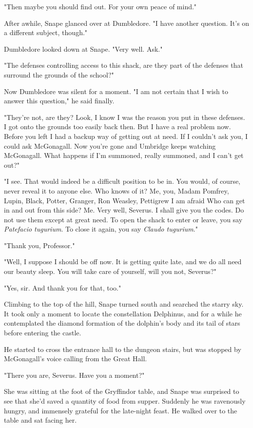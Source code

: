 "Then maybe you should find out. For your own peace of mind."

After awhile, Snape glanced over at Dumbledore. "I have another question. It's on a different subject, though."

Dumbledore looked down at Snape. "Very well. Ask."

"The defenses controlling access to this shack, are they part of the defenses that surround the grounds of the school?"

Now Dumbledore was silent for a moment. "I am not certain that I wish to answer this question," he said finally.

"They're not, are they? Look, I know I was the reason you put in these defenses. I got onto the grounds too easily back{\el} then. But I have a real problem now. Before you left I had a backup way of getting out at need. If I couldn't ask you, I could ask McGonagall. Now you're gone and Umbridge keeps watching McGonagall. What happens if I'm summoned, really summoned, and I can't get out?"

"I see. That would indeed be a difficult position to be in. You would, of course, never reveal it to anyone else. Who knows of it? Me, you, Madam Pomfrey, Lupin, Black, Potter, Granger, Ron Weasley, Pettigrew I am afraid{\el} Who can get in and out from this side? Me. Very well, Severus. I shall give you the codes. Do not use them except at great need. To open the shack to enter or leave, you say \emph{Patefacio tugurium}. To close it again, you say \emph{Claudo tugurium}."

"Thank you, Professor."

"Well, I suppose I should be off now. It is getting quite late, and we do all need our beauty sleep. You will take care of yourself, will you not, Severus?"

"Yes, sir. And thank you for that, too."

Climbing to the top of the hill, Snape turned south and searched the starry sky. It took only a moment to locate the constellation Delphinus, and for a while he contemplated the diamond formation of the dolphin's body and its tail of stars before entering the castle.

He started to cross the entrance hall to the dungeon stairs, but was stopped by McGonagall's voice calling from the Great Hall.

"There you are, Severus. Have you a moment?"

She was sitting at the foot of the Gryffindor table, and Snape was surprised to see that she'd saved a quantity of food from supper. Suddenly he was ravenously hungry, and immensely grateful for the late-night feast. He walked over to the table and sat facing her.

